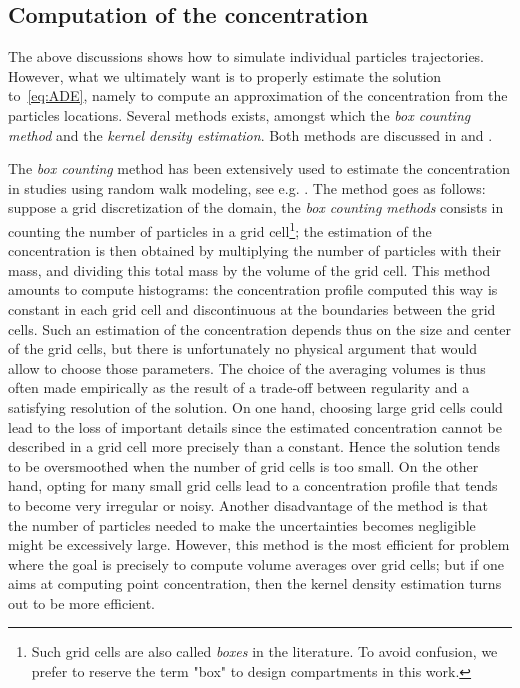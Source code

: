 \subsection{Computation of the concentration} \label{boxcounting_kernel}
The above discussions shows how to simulate individual particles trajectories. However, what we ultimately want is to properly estimate the solution to~\eqref{eq:ADE}, namely to compute an approximation of the concentration from the particles locations. Several methods exists, amongst which the \textit{box counting method} and the \textit{kernel density estimation}. Both methods are discussed in \cite{spivakovskaya2007lagrangian} and \cite{dehaan1999densitykernel}.

The \textit{box counting} method has been extensively used to estimate the concentration in studies using random walk modeling, see e.g. \cite{riddle1998specification}. The method goes as follows: suppose a grid discretization of the domain, the \textit{box counting methods} consists in counting the number of particles in a grid cell\footnote{Such grid cells are also called \textit{boxes} in the literature. To avoid confusion, we prefer to reserve the term "box" to design compartments in this work.}; the estimation of the concentration is then obtained by multiplying the number of particles with their mass, and dividing this total mass by the volume of the grid cell. This method amounts to compute histograms: the concentration profile computed this way is constant in each grid cell and discontinuous at the boundaries between the grid cells. Such an estimation of the concentration depends thus on the size and center of the grid cells, but there is unfortunately no physical argument that would allow to choose those parameters. The choice of the averaging volumes is thus often made empirically as the result of a trade-off between regularity and a satisfying resolution of the solution. On one hand, choosing large grid cells could lead to the loss of important details since the estimated concentration cannot be described in a grid cell more precisely than a constant. Hence the solution tends to be oversmoothed when the number of grid cells is too small. On the other hand, opting for many small grid cells lead to a concentration profile that tends to become very irregular or noisy. Another disadvantage of the method is that the number of particles needed to make the uncertainties becomes negligible might be excessively large. However, this method is the most efficient for problem where the goal is precisely to compute volume averages over grid cells; but if one aims at computing point concentration, then the kernel density estimation turns out to be more efficient.

